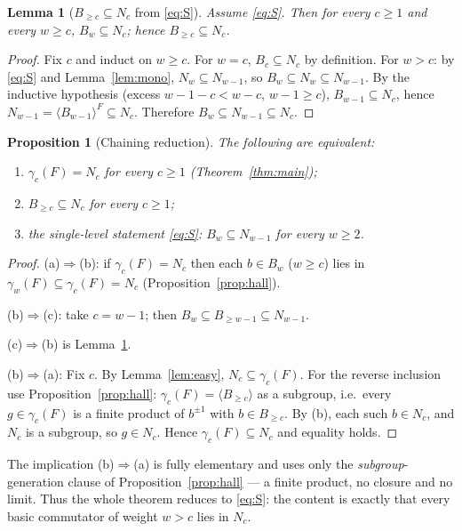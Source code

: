 \documentclass{amsart}
\newtheorem{lemma}{Lemma}
\newtheorem{proposition}{Proposition}
\theoremstyle{definition}
\theoremstyle{remark}
\begin{document}
\begin{lemma}[$B_{\ge c}\subseteq N_c$ from \eqref{eq:S}]\label{lem:Bgec}
Assume \eqref{eq:S}. Then for every $c\ge1$ and every $w\ge c$, $B_w\subseteq N_c$;
hence $B_{\ge c}\subseteq N_c$.
\end{lemma}
\begin{proof}
Fix $c$ and induct on $w\ge c$. For $w=c$, $B_c\subseteq N_c$ by definition. For
$w>c$: by \eqref{eq:S} and Lemma~\ref{lem:mono}, $N_w\subseteq N_{w-1}$, so
$B_w\subseteq N_w\subseteq N_{w-1}$. By the inductive hypothesis (excess
$w-1-c<w-c$, $w-1\ge c$), $B_{w-1}\subseteq N_c$, hence
$N_{w-1}=\langle B_{w-1}\rangle^{F}\subseteq N_c$. Therefore $B_w\subseteq
N_{w-1}\subseteq N_c$.
\end{proof}

\begin{proposition}[Chaining reduction]\label{prop:chain}
The following are equivalent:
\begin{enumerate}
\item[\textup{(a)}] $\gamma_c(F)=N_c$ for every $c\ge1$ \textup{(Theorem~\ref{thm:main})};
\item[\textup{(b)}] $B_{\ge c}\subseteq N_c$ for every $c\ge1$;
\item[\textup{(c)}] the single-level statement \eqref{eq:S}: $B_w\subseteq N_{w-1}$ for every $w\ge2$.
\end{enumerate}
\end{proposition}
\begin{proof}
(a)$\Rightarrow$(b): if $\gamma_c(F)=N_c$ then each $b\in B_w$ ($w\ge c$) lies in
$\gamma_w(F)\subseteq\gamma_c(F)=N_c$ (Proposition~\ref{prop:hall}).

(b)$\Rightarrow$(c): take $c=w-1$; then $B_w\subseteq B_{\ge w-1}\subseteq N_{w-1}$.

(c)$\Rightarrow$(b) is Lemma~\ref{lem:Bgec}.

(b)$\Rightarrow$(a): Fix $c$. By Lemma~\ref{lem:easy}, $N_c\subseteq\gamma_c(F)$. For
the reverse inclusion use Proposition~\ref{prop:hall}: $\gamma_c(F)=\langle B_{\ge
c}\rangle$ as a subgroup, i.e.\ every $g\in\gamma_c(F)$ is a finite product of
$b^{\pm1}$ with $b\in B_{\ge c}$. By (b), each such $b\in N_c$, and $N_c$ is a
subgroup, so $g\in N_c$. Hence $\gamma_c(F)\subseteq N_c$ and equality holds.
\end{proof}

\noindent The implication (b)$\Rightarrow$(a) is fully elementary and uses only the
\emph{subgroup}-generation clause of Proposition~\ref{prop:hall} --- a finite
product, no closure and no limit. Thus the whole theorem reduces to \eqref{eq:S}: the
content is exactly that every basic commutator of weight $w>c$ lies in $N_c$.
\end{document}
